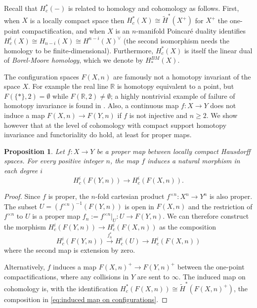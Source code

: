 \documentclass[12pt]{article}
\newcommand{\R}{\mathbb{R}}
\theoremstyle{plain}
\newtheorem{prop}[thm]{Proposition}
\theoremstyle{definition}
\theoremstyle{remark}
\begin{document}
Recall that $H_c^*(-)$ is related to homology and cohomology as follows. First, when $X$ is a locally compact space then $H_c^*(X)\cong \tilde H^*(X^+)$ for $X^+$ the one-point compactification, and when $X$ is an $n$-manifold Poincaré duality identifies $H^i_c(X) \cong H_{n-i}(X) \cong H^{n-i}(X)^{\vee}$ (the second isomorphism needs the homology to be finite-dimensional). Furthermore, $H^*_c(X)$ is itself the linear dual of \emph{Borel-Moore homology}, which we denote by $H^{BM}_*(X)$.

The configuration spaces $F(X, n)$ are famously not a homotopy invariant of the space $X$. For example the real line $\R$ is homotopy equivalent to a point, but $F(\{\ast\},2) = \emptyset$ while $F(\R,2) \neq \emptyset$; a highly nontrivial example of failure of homotopy invariance is found in \cite{LS05}. Also, a continuous map $f\colon X \to Y$ does not induce a map $F(X, n) \to F(Y, n)$ if $f$ is not injective and $n\geq 2$. We show however that at the level of cohomology with compact support homotopy invariance and functoriality do hold, at least for proper maps.

\begin{prop}
    Let $f\colon X\to Y$ be a proper map between locally compact Hausdorff spaces. For every positive integer $n$, the map $f$ induces a natural morphism in each degree $i$
    \[
        H_c^i(F(Y, n)) \to H_c^i(F(X, n)).
    \]
\end{prop}

\begin{proof}
    Since $f$ is proper, the $n$-fold cartesian product $f^{\times n}\colon X^n\to Y^n$ is also proper. The subset $U = (f^{\times n})^{-1}(F(Y, n))$ is open in $F(X, n)$ and the restriction of $f^{\times n}$ to $U$ is a proper map $f_n:= f^{\times n}|_U\colon U\to F(Y, n)$. We can therefore construct the morphism $H_c^i(F(Y, n)) \to H_c^i(F(X, n))$ as the composition
    \begin{equation}\label{eq:induced map on configurations}
        H_c^i(F(Y, n)) \overset{f_n^*}{\longrightarrow} H_c^i(U) \longrightarrow H_c^i(F(X, n))
    \end{equation}
    where the second map is extension by zero.
    
    Alternatively, $f$ induces a map $F(X,n)^+\to F(Y,n)^+$ between the one-point compactifications, where any collisions in $Y$ are sent to $\infty$. The induced map on cohomology is, with the identification $H^*_c(F(X,n)) \cong \tilde{H}^*(F(X,n)^+)$, the composition in \eqref{eq:induced map on configurations}.
\end{proof}
\end{document}
